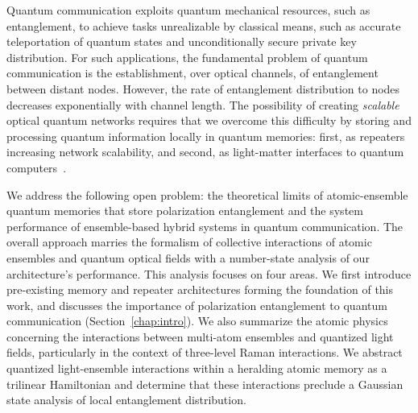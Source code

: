 \documentclass[aps,twocolumn,secnumarabic,amsmath,amssymb,pra,groupedaddress,
showpacs, showkeys,draft]{revtex4-1}
\begin{document}
Quantum communication exploits quantum mechanical resources, such as
entanglement, to achieve tasks unrealizable by classical means, such as
accurate teleportation of quantum states and unconditionally secure private key
distribution. For such applications, the fundamental problem of quantum
communication is the establishment, over optical channels, of entanglement
between distant nodes. However, the rate of entanglement distribution to nodes
decreases exponentially with channel length. The possibility of creating
\emph{scalable} optical quantum networks requires that we overcome this
difficulty by storing and processing quantum information locally in quantum
memories: first, as repeaters increasing network scalability, and second, as
light-matter interfaces to quantum computers~\cite{nature07127}.

We address the following open problem: the theoretical limits of
atomic-ensemble quantum memories that store polarization entanglement and the
system performance of ensemble-based hybrid systems in quantum
communication. The overall approach marries the formalism of collective
interactions of atomic ensembles and quantum optical fields with a number-state
analysis of our architecture's performance. This analysis focuses on four
areas. We first introduce pre-existing memory and repeater architectures
forming the foundation of this work, and discusses the importance of
polarization entanglement to quantum communication
(Section~\ref{chap:intro}). We also summarize the atomic physics concerning the
interactions between multi-atom ensembles and quantized light fields,
particularly in the context of three-level Raman interactions. We abstract
quantized light-ensemble interactions within a heralding atomic memory as a
trilinear Hamiltonian and determine that these interactions preclude a Gaussian
state analysis of local entanglement distribution.
\end{document}
